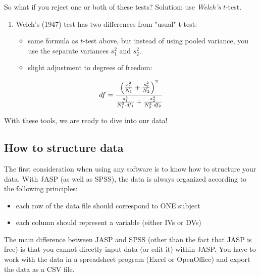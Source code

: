 \documentclass[11pt]{article}
\begin{document}
So what if you reject one or both of these tests?  Solution: use \emph{Welch's} $t$-test.

\begin{enumerate}
\item Welch's (1947) test has two differences from "usual" t-test:
\begin{itemize}
\item same formula as $t$-test above, but instead of using pooled variance, you use the separate variances $s_1^2$ and $s_2^2$.
\item slight adjustment to degrees of freedom:
\end{itemize}
\end{enumerate}
\[
df = \frac{\Bigl(\frac{s_1^2}{N_1}+\frac{s_2^2}{N_2}\Bigr)^2}{\frac{s_1^4}{N_1^2\cdot df_1}+\frac{s_2^4}{N_2^2\cdot df_2}}
\] 

With these tools, we are ready to dive into our data!

\subsection*{How to structure data}
\label{sec-2-2}
The first consideration when using any software is to know how to structure your data.  With JASP (as well as SPSS), the data is always organized according to the following principles:
\begin{itemize}
\item each row of the data file should correspond to ONE subject
\item each column should represent a variable (either IVs or DVs)
\end{itemize}

The main difference between JASP and SPSS (other than the fact that JASP is free) is that you cannot directly input data (or edit it) within JASP.  You have to work with the data in a spreadsheet program (Excel or OpenOffice) and export the data as a CSV file. 
\end{document}
